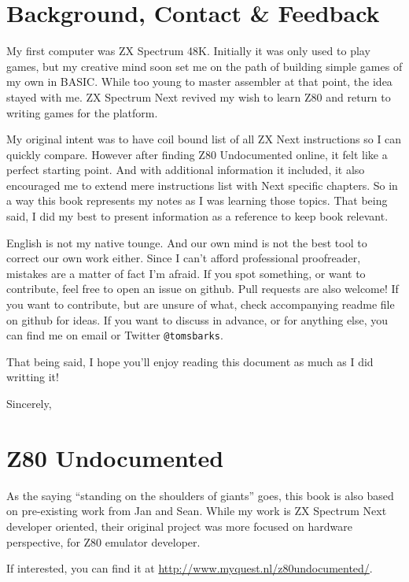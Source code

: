 \documentclass[12pt,twoside,openright,a4paper]{book}
\begin{document}
\pagebreak %
\section{Background, Contact \& Feedback}

My first computer was ZX Spectrum 48K. Initially it was only used to play games, but my creative mind soon set me on the path of building simple games of my own in BASIC. While too young to master assembler at that point, the idea stayed with me. ZX Spectrum Next revived my wish to learn Z80 and return to writing games for the platform.
	
My original intent was to have coil bound list of all ZX Next instructions so I can quickly compare. However after finding Z80 Undocumented online, it felt like a perfect starting point. And with additional information it included, it also encouraged me to extend mere instructions list with Next specific chapters. So in a way this book represents my notes as I was learning those topics. That being said, I did my best to present information as a reference to keep book relevant.

English is not my native tounge. And our own mind is not the best tool to correct our own work either. Since I can't afford professional proofreader, mistakes are a matter of fact I'm afraid. If you spot something, or want to contribute, feel free to open an issue on github. Pull requests are also welcome! If you want to contribute, but are unsure of what, check accompanying readme file on github for ideas. If you want to discuss in advance, or for anything else, you can find me on email  or Twitter {\tt @tomsbarks}.

That being said, I hope you'll enjoy reading this document as much as I did writting it!

Sincerely, \AuthorName


\pagebreak
\section{Z80 Undocumented}

As the saying ``standing on the shoulders of giants'' goes, this book is also based on pre-existing work from Jan and Sean. While my work is ZX Spectrum Next developer oriented, their original project was more focused on hardware perspective, for Z80 emulator developer.

If interested, you can find it at \url{http://www.myquest.nl/z80undocumented/}.
\end{document}
